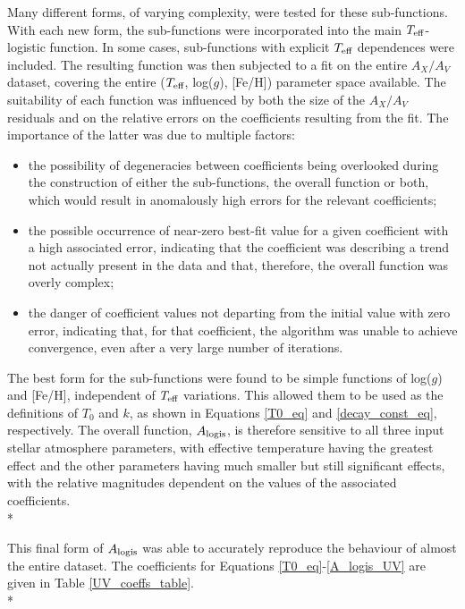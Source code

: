 \documentclass[12pt, a4paper]{report}
\begin{document}
Many different forms, of varying complexity, were tested for these sub-functions. With each new form, the sub-functions were incorporated into the main $T_{\textnormal{eff}}$-logistic function. In some cases, sub-functions with explicit $T_{\textnormal{eff}}$ dependences were included. The resulting function was then subjected to a fit on the entire $A_{X}/A_{V}$ dataset, covering the entire ($T_{\textnormal{eff}}$,  log($g$), [Fe/H]) parameter space available. The suitability of each function was influenced by both the size of the $A_{X}/A_{V}$ residuals and on the relative errors on the coefficients resulting from the fit. The importance of the latter was due to multiple factors:

\begin{itemize}
\item the possibility of degeneracies between coefficients being overlooked during the construction of either the sub-functions, the overall function or both, which would result in anomalously high errors for the relevant coefficients;
\item the possible occurrence of near-zero best-fit value for a given coefficient with a high associated error, indicating that the coefficient was describing a trend not actually present in the data and that, therefore, the overall function was overly complex;
\item the danger of coefficient values not departing from the initial value with zero error, indicating that, for that coefficient, the algorithm was unable to achieve convergence, even after a very large number of iterations.
\end{itemize}

The best form for the sub-functions were found to be simple functions of log($g$) and [Fe/H], independent of $T_{\textnormal{eff}}$ variations. This allowed them to be used as the definitions of $T_{0}$ and $k$, as shown in Equations \ref{T0_eq} and \ref{decay_const_eq}, respectively. The overall function, $A_{\textnormal{logis}}$, is therefore sensitive to all three input stellar atmosphere parameters, with effective temperature having the greatest effect and the other parameters having much smaller but still significant effects, with the relative magnitudes dependent on the values of the associated coefficients.\\*

This final form of $A_{\textnormal{logis}}$ was able to accurately reproduce the behaviour of almost the entire dataset. The coefficients for Equations \ref{T0_eq}-\ref{A_logis_UV} are given in Table \ref{UV_coeffs_table}. \\*
\end{document}
